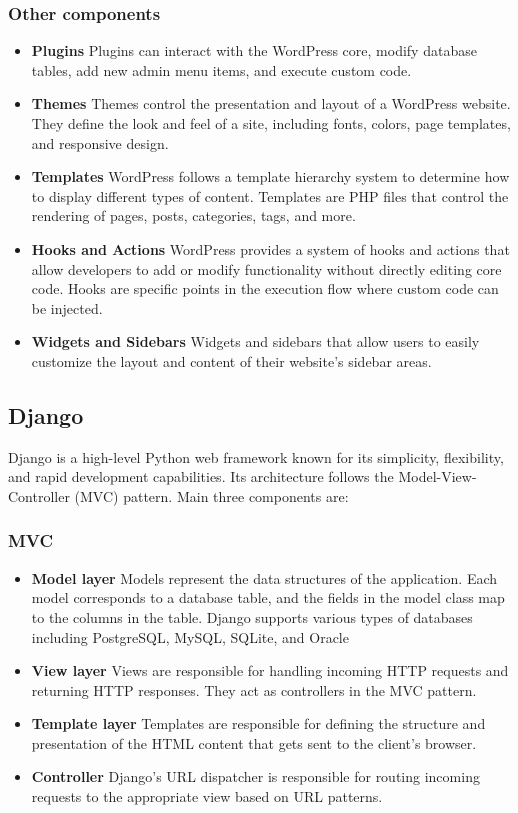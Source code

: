 \documentclass{article}
\begin{document}
	\subsubsection{Other components}
	\begin{itemize}
		\item \textbf{Plugins} Plugins can interact with the WordPress core, modify database tables, add new admin menu items, and execute custom code.
		\item \textbf{Themes} Themes control the presentation and layout of a WordPress website. They define the look and feel of a site, including fonts, colors, page templates, and responsive design.
		\item \textbf{Templates} WordPress follows a template hierarchy system to determine how to display different types of content. Templates are PHP files that control the rendering of pages, posts, categories, tags, and more.
		\item \textbf{Hooks and Actions} WordPress provides a system of hooks and actions that allow developers to add or modify functionality without directly editing core code. Hooks are specific points in the execution flow where custom code can be injected.
		\item \textbf{Widgets and Sidebars}	 Widgets and sidebars that allow users to easily customize the layout and content of their website's sidebar areas.
	
	\end{itemize}
		
	\subsection{Django}
	Django is a high-level Python web framework known for its simplicity, flexibility, and rapid development capabilities. Its architecture follows the Model-View-Controller (MVC) pattern. Main three components are:
	\subsubsection{MVC}
	\begin{itemize}
		\item \textbf{Model layer}  Models represent the data structures of the application. Each model corresponds to a database table, and the fields in the model class map to the columns in the table. Django supports various types of databases including PostgreSQL, MySQL, SQLite, and Oracle
		\item \textbf{View layer} Views are responsible for handling incoming HTTP requests and returning HTTP responses. They act as controllers in the MVC pattern.
		\item \textbf{Template layer} Templates are responsible for defining the structure and presentation of the HTML content that gets sent to the client's browser.
		\item \textbf{Controller} Django's URL dispatcher is responsible for routing incoming requests to the appropriate view based on URL patterns.
	\end{itemize}
\end{document}

